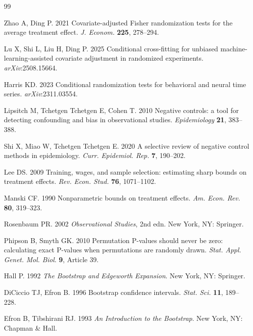 \documentclass[11pt,a4paper]{article}
\theoremstyle{definition}
\begin{document}
\begin{thebibliography}{99}

Zhao A, Ding P. 2021 Covariate-adjusted Fisher randomization tests for the
average treatment effect. \textit{J. Econom.} \textbf{225}, 278--294.

Lu X, Shi L, Liu H, Ding P. 2025 Conditional cross-fitting for unbiased
machine-learning-assisted covariate adjustment in randomized experiments.
\textit{arXiv}:2508.15664.

Harris KD. 2023 Conditional randomization tests for behavioral and neural time
series. \textit{arXiv}:2311.03554.

Lipsitch M, Tchetgen Tchetgen E, Cohen T. 2010 Negative controls: a tool for
detecting confounding and bias in observational studies.
\textit{Epidemiology} \textbf{21}, 383--388.

Shi X, Miao W, Tchetgen Tchetgen E. 2020 A selective review of negative control
methods in epidemiology. \textit{Curr. Epidemiol. Rep.} \textbf{7}, 190--202.

Lee DS. 2009 Training, wages, and sample selection: estimating sharp bounds on
treatment effects. \textit{Rev. Econ. Stud.} \textbf{76}, 1071--1102.

Manski CF. 1990 Nonparametric bounds on treatment effects.
\textit{Am. Econ. Rev.} \textbf{80}, 319--323.

Rosenbaum PR. 2002 \textit{Observational Studies}, 2nd edn. New York, NY:
Springer.

Phipson B, Smyth GK. 2010 Permutation P-values should never be zero: calculating
exact P-values when permutations are randomly drawn.
\textit{Stat. Appl. Genet. Mol. Biol.} \textbf{9}, Article 39.

Hall P. 1992 \textit{The Bootstrap and Edgeworth Expansion}. New York, NY:
Springer.

DiCiccio TJ, Efron B. 1996 Bootstrap confidence intervals.
\textit{Stat. Sci.} \textbf{11}, 189--228.

Efron B, Tibshirani RJ. 1993 \textit{An Introduction to the Bootstrap}.
New York, NY: Chapman \& Hall.

\end{thebibliography}
\end{document}
